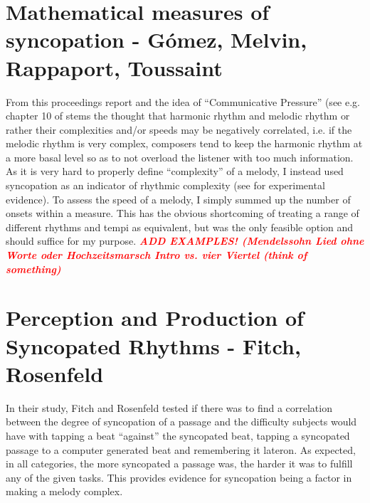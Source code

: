 \documentclass[a4paper,12pt]{report}
\begin{document}
\section{Mathematical measures of syncopation - Gómez, Melvin, Rappaport, Toussaint}
\cite{gomez2005mathematical}
From this proceedings report and the idea of ``Communicative Pressure'' (see e.g. chapter 10 of \cite{
temperley2007music} stems the thought that harmonic rhythm and melodic rhythm or rather their
complexities and/or speeds may be negatively correlated, i.e. if the melodic rhythm is very complex,
composers tend to keep the harmonic rhythm at a more basal level so as to not overload the listener
with too much information. As it is very hard to properly define ``complexity'' of a melody, I instead
used syncopation as an indicator of rhythmic complexity (see \cite{fitch2007perception} for
experimental evidence). To assess the speed of a melody, I simply summed up the number of onsets
within a measure. This has the obvious shortcoming of treating a range of different rhythms and tempi
as equivalent, but was the only feasible option and should suffice for my purpose.
\textbf{\textit{\textcolor{red}{ADD EXAMPLES! (Mendelssohn Lied ohne Worte oder Hochzeitsmarsch
Intro vs. vier Viertel (think of something)}}}

\section{Perception and Production of Syncopated Rhythms - Fitch, Rosenfeld}
\cite{fitch2007perception}
In their study, Fitch and Rosenfeld tested if there was to find a correlation between the degree of
syncopation of a passage and the difficulty subjects would have with tapping a beat ``against'' the
syncopated beat, tapping a syncopated passage to a computer generated beat and remembering it
lateron. As expected, in all categories, the more syncopated a passage was, the harder it was to
fulfill any of the given tasks. This provides evidence for syncopation being a factor in making a melody
complex.



\newpage


\end{document}
